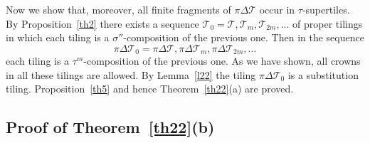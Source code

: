 \documentclass[12pt]{article}
\theoremstyle{remark}
\begin{document}
Now we  show that, moreover, all finite fragments 
of $\pi\Delta\mathcal T$ occur in $\tau$-supertiles.
 By Proposition~\ref{th2} there exists a sequence $\mathcal T_0=\mathcal T, \mathcal T_m, \mathcal T_{2m},\dots$ of proper tilings   
 in which each tiling is a $\sigma''$-composition of the previous one.
 Then in the sequence 
$$
\pi \Delta \mathcal T_0=\pi\Delta\mathcal T, \pi\Delta\mathcal T_m, \pi\Delta\mathcal T_{2m},\dots
$$  
each tiling is a $\tau^m$-composition of the previous one.
As we have shown, all crowns in all these tilings are allowed.
 By Lemma~\ref{l22} the tiling $\pi\Delta\mathcal T_0$ is a substitution tiling. 
Proposition~\ref{th5} and hence Theorem~\ref{th22}(a) are proved.
 
 \subsection{Proof of Theorem~\ref{th22}(b)}
\end{document}
